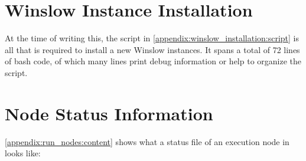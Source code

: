 
\chapter{Winslow Instance Installation}
\label{appendix:winslow_installation}

At the time of writing this, the script in \autoref{appendix:winslow_installation:script} is all that is required to install a new Winslow instances.
It spans a total of 72 lines of bash code, of which many lines print debug information or help to organize the script.


\chapter{Node Status Information}
\label{appendix:run_nodes}

\autoref{appendix:run_nodes:content} shows what a status file of an execution node in  looks like:



